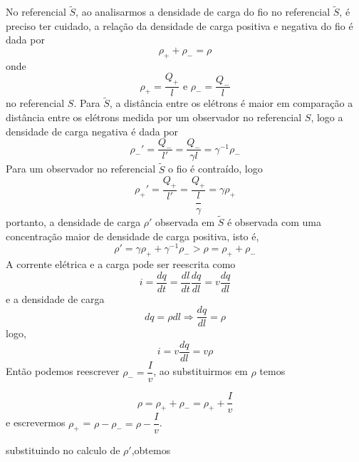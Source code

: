 \documentclass[10pt,a4paper]{article}
\begin{document}
\begin{enumerate}
\begin{enumerate}
		No referencial $\tilde{S}$,
		ao analisarmos a densidade de carga do fio no referencial $\tilde{S}$, é preciso ter cuidado, a relação da densidade de carga positiva e negativa do fio é dada por
		\begin{equation*}
			\rho_+ +\rho_- = \rho
		\end{equation*}
		onde
		\begin{equation*}
			\rho_+ = \frac{Q_+}{l}\text{ e  } \rho_- = \frac{Q_-}{l}
		\end{equation*}
		no referencial $ S $.
		Para $\tilde{S}$, a distância entre os elétrons é maior em comparação a distância entre os elétrons medida por um observador no referencial $ S $, logo a densidade de carga negativa é dada por
		\begin{equation*}
			\rho_-'  = \dfrac{Q_-}{l'}=\dfrac{Q_-}{\gamma l} = \gamma^{-1} \rho_-
		\end{equation*}
		Para um observador no referencial $\tilde{S}$ o fio é contraído, logo
		\begin{equation*}
			\rho_+\prime = \dfrac{Q_+}{l\prime} = \dfrac{Q_+}{\dfrac{l}{\gamma}} = \gamma\rho_+
		\end{equation*}
		portanto, a densidade de carga $\rho\prime$ observada em $\tilde{S}$ é observada com uma concentração maior de densidade de carga positiva, isto é,
		\begin{equation*}
			\rho\prime = \gamma\rho_+ + \gamma^{-1}\rho_- > \rho = \rho_+ + \rho_-
		\end{equation*}
		A corrente elétrica e a carga pode ser reescrita como 
		\begin{equation*}
			i = \dfrac{dq}{dt} = \dfrac{dl}{dt}\dfrac{dq}{dl} = v \dfrac{dq}{dl}
		\end{equation*}
		e a densidade de carga
		\begin{equation*}
			dq = \rho dl \Rightarrow \dfrac{dq}{dl} = \rho
		\end{equation*}
		logo,
		\begin{equation*}
			i = v\dfrac{dq}{dl} = v\rho
		\end{equation*}	
		Então podemos reescrever $\rho_- = \dfrac{I}{v}$, ao substituirmos em $\rho$ temos
		
		\begin{equation*}
			\rho = \rho_++\rho_- = \rho_+ + \dfrac{I}{v}
		\end{equation*}
		e escrevermos $\rho_+$ = $\rho - \rho_- = \rho - \dfrac{I}{v}$.
		
		substituindo no calculo de $\rho\prime$,obtemos
		

\end{enumerate}
\end{enumerate}
\end{document}
